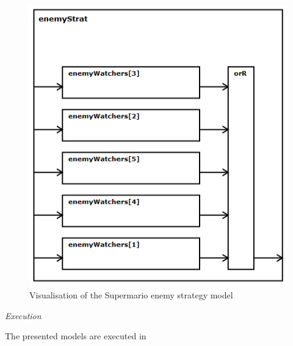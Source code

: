 \begin{figure}
	\centering
	\includegraphics[scale=0.4]{pictures/haller_enemystrategy.PNG}
	\caption{Visualisation of the Supermario enemy strategy model}
	\label{fig:marioEnemyStrategy}
\end{figure}


\emph{Execution}

The presented models are executed in